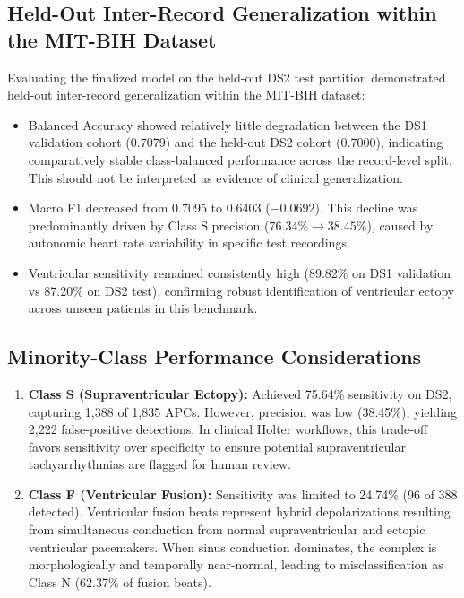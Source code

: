\documentclass[conference]{IEEEtran}
\begin{document}
\subsection{Held-Out Inter-Record Generalization within the MIT-BIH Dataset}
Evaluating the finalized model on the held-out DS2 test partition demonstrated held-out inter-record generalization within the MIT-BIH dataset:
\begin{itemize}
    \item Balanced Accuracy showed relatively little degradation between the DS1 validation cohort (0.7079) and the held-out DS2 cohort (0.7000), indicating comparatively stable class-balanced performance across the record-level split. This should not be interpreted as evidence of clinical generalization.
    \item Macro F1 decreased from 0.7095 to 0.6403 ($-0.0692$). This decline was predominantly driven by Class S precision ($76.34\% \to 38.45\%$), caused by autonomic heart rate variability in specific test recordings.
    \item Ventricular sensitivity remained consistently high (89.82\% on DS1 validation vs 87.20\% on DS2 test), confirming robust identification of ventricular ectopy across unseen patients in this benchmark.
\end{itemize}

\subsection{Minority-Class Performance Considerations}
\begin{enumerate}
    \item \textbf{Class S (Supraventricular Ectopy):} Achieved 75.64\% sensitivity on DS2, capturing 1,388 of 1,835 APCs. However, precision was low (38.45\%), yielding 2,222 false-positive detections. In clinical Holter workflows, this trade-off favors sensitivity over specificity to ensure potential supraventricular tachyarrhythmias are flagged for human review.
    \item \textbf{Class F (Ventricular Fusion):} Sensitivity was limited to 24.74\% (96 of 388 detected). Ventricular fusion beats represent hybrid depolarizations resulting from simultaneous conduction from normal supraventricular and ectopic ventricular pacemakers. When sinus conduction dominates, the complex is morphologically and temporally near-normal, leading to misclassification as Class N (62.37\% of fusion beats).
\end{enumerate}
\end{document}
